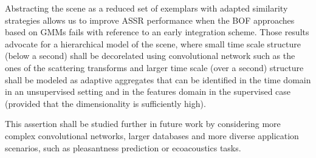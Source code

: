 \documentclass[journal]{IEEEtran}
\begin{document}
Abstracting the scene as a reduced set of exemplars with adapted similarity strategies allows us to improve ASSR performance when the BOF approaches based on GMMs fails with reference to an early integration scheme. Those results advocate for a hierarchical model of the scene, where small time scale structure  (below a second) shall be decorelated using convolutional network such as the ones of the scattering transforms and larger time scale (over a second) structure shall be modeled as adaptive aggregates that can be identified in the time domain in an unsupervised setting and in the features domain in the supervised case (provided that the dimensionality is sufficiently high). 

This assertion shall be studied further in future work by considering more complex convolutional networks, larger databases and more diverse application scenarios, such as pleasantness prediction \cite{lafaySoundscapePilot, lafay:hal-01111782} or ecoacoustics tasks.




% 










\end{document}
